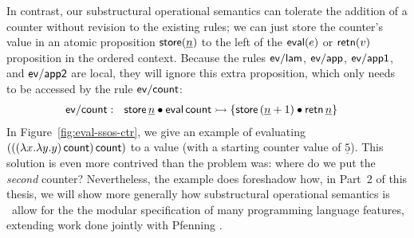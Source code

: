 In contrast, our substructural operational semantics can tolerate the
addition of a counter without revision to the existing rules; we can
just store the counter's value in an atomic proposition ${\sf
  store}(\underline{n})$ to the left of the ${\sf eval}(e)$ or ${\sf
  retn}(v)$ proposition in the ordered context. Because the rules
${\sf ev/lam}$, ${\sf ev/app}$, ${\sf ev/app1}$, and ${\sf ev/app2}$
are local, they will ignore this extra proposition, which only
needs to be accessed by the rule ${\sf ev/count}$:
\begin{align*}
{\sf ev/count} &:~~
  {\sf store}\,\underline n \mathbin{\bullet} {\sf eval}\,{\sf count}
    \rightarrowtail \{ {\sf store}\,(\underline n + 1) 
      \mathbin{\bullet} {\sf retn}\,\underline n \}
\end{align*}
In Figure~\ref{fig:eval-ssos-ctr}, we give an example of evaluating
$(((\lambda x.\lambda y.y)\,{\sf count})\,{\sf count})$ to a value
(with a starting counter value of $\underline 5$). This solution is
even more contrived than the problem was: where do we put the {\it
  second} counter? Nevertheless, the example does foreshadow how, in
Part~2 of this thesis, we will show more generally how substructural
operational semantics is \sls~allow for the the modular specification
of many programming language features, extending work done jointly
with Pfenning \cite{pfenning09substructural}.

